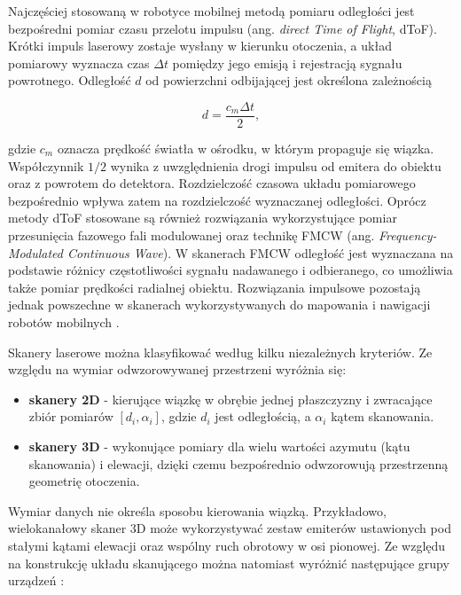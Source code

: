 \documentclass[a4paper,twoside,12pt]{book}
\begin{document}
Najczęściej stosowaną w robotyce mobilnej metodą pomiaru odległości jest bezpośredni pomiar czasu przelotu impulsu (ang. \textit{direct Time of Flight}, dToF). Krótki impuls laserowy zostaje wysłany w kierunku otoczenia, a układ pomiarowy wyznacza czas $\Delta t$ pomiędzy jego emisją i rejestracją sygnału powrotnego. Odległość $d$ od powierzchni odbijającej jest określona zależnością

\begin{equation}
    d = \frac{c_m \Delta t}{2},
    \label{eq:lidar_tof}
\end{equation}

gdzie $c_m$ oznacza prędkość światła w ośrodku, w którym propaguje się wiązka. Współczynnik $1/2$ wynika z uwzględnienia drogi impulsu od emitera do obiektu oraz z powrotem do detektora. Rozdzielczość czasowa układu pomiarowego bezpośrednio wpływa zatem na rozdzielczość wyznaczanej odległości. Oprócz metody dToF stosowane są również rozwiązania wykorzystujące pomiar przesunięcia fazowego fali modulowanej oraz technikę FMCW (ang. \textit{Frequency-Modulated Continuous Wave}). W skanerach FMCW odległość jest wyznaczana na podstawie różnicy częstotliwości sygnału nadawanego i odbieranego, co umożliwia także pomiar prędkości radialnej obiektu. Rozwiązania impulsowe pozostają jednak powszechne w skanerach wykorzystywanych do mapowania i nawigacji robotów mobilnych \cite{behroozpour2017lidar,royo2019overview}.

Skanery laserowe można klasyfikować według kilku niezależnych kryteriów. Ze względu na wymiar odwzorowywanej przestrzeni wyróżnia się:

\begin{itemize}
    \item \textbf{skanery 2D} - kierujące wiązkę w obrębie jednej płaszczyzny i zwracające zbiór pomiarów $[d_i,\alpha_i]$, gdzie $d_i$ jest odległością, a $\alpha_i$ kątem skanowania.
    \item \textbf{skanery 3D} - wykonujące pomiary dla wielu wartości azymutu (kątu skanowania) i elewacji, dzięki czemu bezpośrednio odwzorowują przestrzenną geometrię otoczenia.
\end{itemize}

Wymiar danych nie określa sposobu kierowania wiązką. Przykładowo, wielokanałowy skaner 3D może wykorzystywać zestaw emiterów ustawionych pod stałymi kątami elewacji oraz wspólny ruch obrotowy w osi pionowej. Ze względu na konstrukcję układu skanującego można natomiast wyróżnić następujące grupy urządzeń \cite{royo2019overview}:
\end{document}
